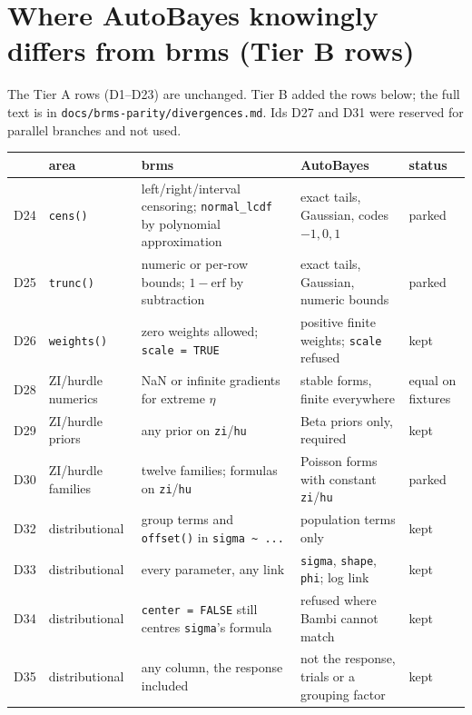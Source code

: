 \documentclass[11pt]{article}
\newcommand{\code}[1]{\texttt{#1}}
\newcommand{\file}[1]{\texttt{#1}}
\begin{document}
\section{Where AutoBayes knowingly differs from brms (Tier B rows)}
\label{sec:divergences}

The Tier A rows (D1--D23) are unchanged. Tier B added the rows below;
the full text is in \file{docs/brms-parity/divergences.md}. Ids D27 and D31 were reserved for parallel branches and
not used.

\small
\begin{center}\begin{tabular}{@{}p{}>{\raggedright\arraybackslash}p{}>{\raggedright\arraybackslash}p{}>{\raggedright\arraybackslash}p{}>{\raggedright\arraybackslash}p{}@{}}
\toprule
& area & brms & AutoBayes & status \\
\midrule
D24 & \code{cens()} & left/right/interval censoring; \code{normal\_lcdf} by polynomial approximation & exact tails, Gaussian, codes $-1, 0, 1$ & parked \\
D25 & \code{trunc()} & numeric or per-row bounds; $1-\mathrm{erf}$ by subtraction & exact tails, Gaussian, numeric bounds & parked \\
D26 & \code{weights()} & zero weights allowed; \code{scale = TRUE} & positive finite weights; \code{scale} refused & kept \\
D28 & ZI/hurdle numerics & NaN or infinite gradients for extreme $\eta$ & stable forms, finite everywhere & equal on fixtures \\
D29 & ZI/hurdle priors & any prior on \code{zi}/\code{hu} & Beta priors only, required & kept \\
D30 & ZI/hurdle families & twelve families; formulas on \code{zi}/\code{hu} & Poisson forms with constant \code{zi}/\code{hu} & parked \\
D32 & distributional & group terms and \code{offset()} in \code{sigma \textasciitilde{} ...} & population terms only & kept \\
D33 & distributional & every parameter, any link & \code{sigma}, \code{shape}, \code{phi}; log link & kept \\
D34 & distributional & \code{center = FALSE} still centres \code{sigma}'s formula & refused where Bambi cannot match & kept \\
D35 & distributional & any column, the response included & not the response, trials or a grouping factor & kept \\

\end{tabular}
\end{center}
\end{document}
